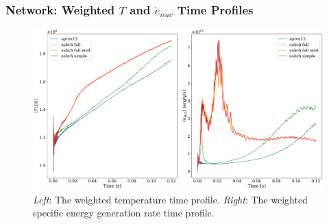 \documentclass[
	11pt, %
]{beamer}
\begin{document}

\begin{frame}
\frametitle{Network: Weighted $T$ and $\dot{e}_{nuc}$ Time Profiles}
    \begin{figure}
        \centering
        \includegraphics[width=1\linewidth]{network_time_profile.pdf}
        \caption{{\it Left}: The weighted temperature time profile. {\it Right}: The weighted specific energy generation rate time profile.}
    \end{figure}
\end{frame}
\end{document}
